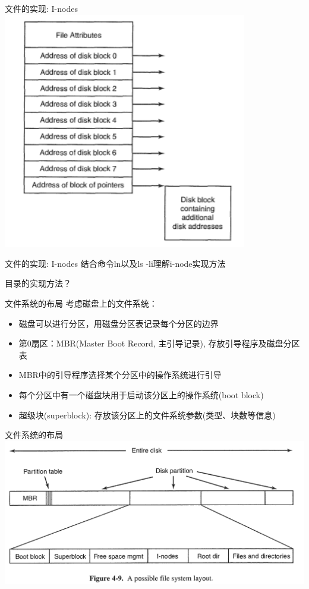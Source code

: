 \documentclass[xcolor=svgnames]{beamer}
\begin{document}
\begin{CJK*}{UTF8}{gbsn}
\begin{frame}{文件的实现: I-nodes}
\includegraphics[width=0.8\textwidth]{inodes.png}
\end{frame}

\begin{frame}{文件的实现: I-nodes}
结合命令ln以及ls -li理解i-node实现方法

目录的实现方法？
\end{frame}

\begin{frame}{文件系统的布局}
考虑磁盘上的文件系统：
\begin{itemize}
\item 磁盘可以进行分区，用磁盘分区表记录每个分区的边界
\item 第0扇区：MBR(Master Boot Record, 主引导记录), 存放引导程序及磁盘分区表
\item MBR中的引导程序选择某个分区中的操作系统进行引导
\item 每个分区中有一个磁盘块用于启动该分区上的操作系统(boot block)
\item 超级块(superblock): 存放该分区上的文件系统参数(类型、块数等信息)
\end{itemize}
\end{frame}

\begin{frame}{文件系统的布局}
\includegraphics[width=1.0\textwidth]{layout.png}
\end{frame}


\end{CJK*}
\end{document}
